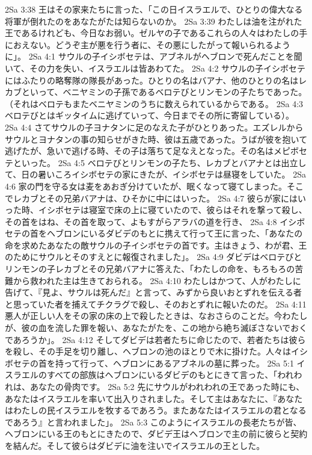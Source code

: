 2Sa 3:38  王はその家来たちに言った、「この日イスラエルで、ひとりの偉大なる将軍が倒れたのをあなたがたは知らないのか。
2Sa 3:39  わたしは油を注がれた王であるけれども、今日なお弱い。ゼルヤの子であるこれらの人々はわたしの手におえない。どうぞ主が悪を行う者に、その悪にしたがって報いられるように」。
2Sa 4:1  サウルの子イシボセテは、アブネルがヘブロンで死んだことを聞いて、その力を失い、イスラエルは皆あわてた。
2Sa 4:2  サウルの子イシボセテにはふたりの略奪隊の隊長があった。ひとりの名はバアナ、他のひとりの名はレカブといって、ベニヤミンの子孫であるベロテびとリンモンの子たちであった。（それはベロテもまたベニヤミンのうちに数えられているからである。
2Sa 4:3  ベロテびとはギッタイムに逃げていって、今日までその所に寄留している）。
2Sa 4:4  さてサウルの子ヨナタンに足のなえた子がひとりあった。エズレルからサウルとヨナタンの事の知らせがきた時、彼は五歳であった。うばが彼を抱いて逃げたが、急いで逃げる時、その子は落ちて足なえとなった。その名はメピボセテといった。
2Sa 4:5  ベロテびとリンモンの子たち、レカブとバアナとは出立して、日の暑いころイシボセテの家にきたが、イシボセテは昼寝をしていた。
2Sa 4:6  家の門を守る女は麦をあおぎ分けていたが、眠くなって寝てしまった。そこでレカブとその兄弟バアナは、ひそかに中にはいった。
2Sa 4:7  彼らが家にはいった時、イシボセテは寝室で床の上に寝ていたので、彼らはそれを撃って殺し、その首をはね、その首を取って、よもすがらアラバの道を行き、
2Sa 4:8  イシボセテの首をヘブロンにいるダビデのもとに携えて行って王に言った、「あなたの命を求めたあなたの敵サウルの子イシボセテの首です。主はきょう、わが君、王のためにサウルとそのすえとに報復されました」。
2Sa 4:9  ダビデはベロテびとリンモンの子レカブとその兄弟バアナに答えた、「わたしの命を、もろもろの苦難から救われた主は生きておられる。
2Sa 4:10  わたしはかつて、人がわたしに告げて、『見よ、サウルは死んだ』と言って、みずから良いおとずれを伝える者と思っていた者を捕えてチクラグで殺し、そのおとずれに報いたのだ。
2Sa 4:11  悪人が正しい人をその家の床の上で殺したときは、なおさらのことだ。今わたしが、彼の血を流した罪を報い、あなたがたを、この地から絶ち滅ぼさないでおくであろうか」。
2Sa 4:12  そしてダビデは若者たちに命じたので、若者たちは彼らを殺し、その手足を切り離し、ヘブロンの池のほとりで木に掛けた。人々はイシボセテの首を持って行って、ヘブロンにあるアブネルの墓に葬った。
2Sa 5:1  イスラエルのすべての部族はヘブロンにいるダビデのもとにきて言った、「われわれは、あなたの骨肉です。
2Sa 5:2  先にサウルがわれわれの王であった時にも、あなたはイスラエルを率いて出入りされました。そして主はあなたに、『あなたはわたしの民イスラエルを牧するであろう。またあなたはイスラエルの君となるであろう』と言われました」。
2Sa 5:3  このようにイスラエルの長老たちが皆、ヘブロンにいる王のもとにきたので、ダビデ王はヘブロンで主の前に彼らと契約を結んだ。そして彼らはダビデに油を注いでイスラエルの王とした。
